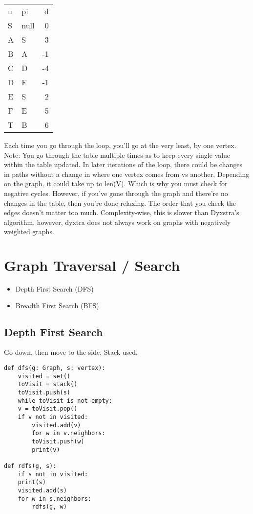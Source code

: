 \documentclass{article}
\begin{document}
\begin{center}
\begin{tabular}{llr}
u & pi & d\\
S & null & 0\\
A & S & 3\\
B & A & -1\\
C & D & -4\\
D & F & -1\\
E & S & 2\\
F & E & 5\\
T & B & 6\\
\end{tabular}
\end{center}

Each time you go through the loop, you'll go at the very least, by one vertex. Note: You go through the table multiple times as to keep every single value within the table updated. In later iterations of the loop, there could be changes in paths without a change in where one vertex comes from vs another. Depending on the graph, it could take up to len(V). Which is why you must check for negative cycles. However, if you've gone through the graph and there're no changes in the table, then you're done relaxing. The order that you check the edges doesn't matter too much.
Complexity-wise, this is slower than Dyxstra's algorithm, however, dyxtra does not always work on graphs with negatively weighted graphs.

\section{Graph Traversal / Search}
\label{sec:orgf542ddb}
\begin{itemize}
\item Depth First Search (DFS)
\item Breadth First Search (BFS)
\end{itemize}
\subsection{Depth First Search}
\label{sec:org3096601}
Go down, then move to the side. Stack used.
\begin{verbatim}
def dfs(g: Graph, s: vertex):
    visited = set()
    toVisit = stack()
    toVisit.push(s)
    while toVisit is not empty:
	v = toVisit.pop()
	if v not in visited:
	    visited.add(v)
	    for w in v.neighbors:
		toVisit.push(w)
	    print(v)

def rdfs(g, s):
    if s not in visited:
	print(s)
	visited.add(s)
	for w in s.neighbors:
	    rdfs(g, w)
\end{verbatim}
\end{document}
